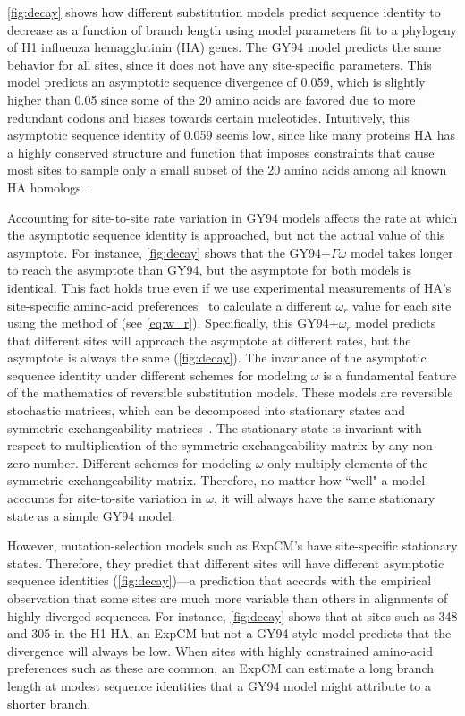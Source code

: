 \documentclass[11pt]{article}
\begin{document}
\ref{fig:decay} shows how different substitution models predict sequence identity to decrease as a function of branch length using model parameters fit to a phylogeny of H1 influenza hemagglutinin (HA) genes.
The GY94 model predicts the same behavior for all sites, since it does not have any site-specific parameters.
This model predicts an asymptotic sequence divergence of 0.059, which is slightly higher than 0.05 since some of the 20 amino acids are favored due to more redundant codons and biases towards certain nucleotides.
Intuitively, this asymptotic sequence identity of 0.059 seems low, since like many proteins HA has a highly conserved structure and function that imposes constraints that cause most sites to sample only a small subset of the 20 amino acids among all known HA homologs~\citep{nobusawa1991comparison}.

Accounting for site-to-site rate variation in GY94 models affects the rate at which the asymptotic sequence identity is approached, but not the actual value of this asymptote. 
For instance, \ref{fig:decay} shows that the GY94+$\Gamma\omega$ model takes longer to reach the asymptote than GY94, but the asymptote for both models is identical. 
This fact holds true even if we use experimental measurements of HA's site-specific amino-acid preferences~\citep{doud2016accurate} to calculate a different $\omega_r$ value for each site using the method of \citet{spielman2015relationship} (see \ref{eq:w_r}).
Specifically, this GY94+$\omega_r$ model predicts that different sites will approach the asymptote at different rates, but the asymptote is always the same (\ref{fig:decay}).
The invariance of the asymptotic sequence identity under different schemes for modeling $\omega$ is a fundamental feature of the mathematics of reversible substitution models.
These models are reversible stochastic matrices, which can be decomposed into stationary states and symmetric exchangeability matrices~\citep{nielsen2006statistical}.
The stationary state is invariant with respect to multiplication of the symmetric exchangeability matrix by any non-zero number.
Different schemes for modeling $\omega$ only multiply elements of the symmetric exchangeability matrix.
Therefore, no matter how ``well" a model accounts for site-to-site variation in $\omega$, it will always have the same stationary state as a simple GY94 model. 

However, mutation-selection models such as ExpCM's have site-specific stationary states.
Therefore, they predict that different sites will have different asymptotic sequence identities (\ref{fig:decay})---a prediction that accords with the empirical observation that some sites are much more variable than others in alignments of highly diverged sequences.
For instance, \ref{fig:decay} shows that at sites such as 348 and 305 in the H1 HA, an ExpCM but not a GY94-style model predicts that the divergence will always be low. 
When sites with highly constrained amino-acid preferences such as these are common, an ExpCM can estimate a long branch length at modest sequence identities that a GY94 model might attribute to a shorter branch.
\end{document}
